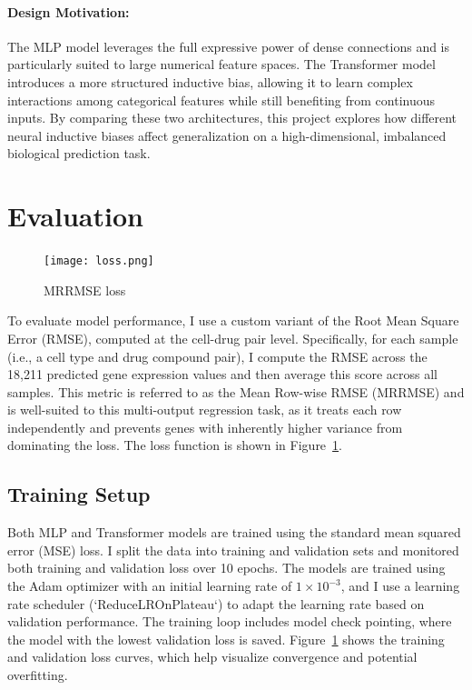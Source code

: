 \documentclass[11pt, oneside]{article}   	%
\begin{document}
\paragraph{Design Motivation:}
The MLP model leverages the full expressive power of dense connections and is particularly suited to large numerical feature spaces. The Transformer model introduces a more structured inductive bias, allowing it to learn complex interactions among categorical features while still benefiting from continuous inputs. By comparing these two architectures, this project explores how different neural inductive biases affect generalization on a high-dimensional, imbalanced biological prediction task.


\section*{Evaluation}

\begin{figure}[htbp]
  \centering
  \texttt{[image: loss.png]}
  \caption{MRRMSE loss}
  \label{fig:rmse}
\end{figure}

To evaluate model performance, I use a custom variant of the Root Mean Square Error (RMSE), computed at the cell-drug pair level. Specifically, for each sample (i.e., a cell type and drug compound pair), I compute the RMSE across the 18,211 predicted gene expression values and then average this score across all samples. This metric is referred to as the Mean Row-wise RMSE (MRRMSE) and is well-suited to this multi-output regression task, as it treats each row independently and prevents genes with inherently higher variance from dominating the loss. The loss function is shown in Figure~\ref{fig:rmse}. 

\subsection*{Training Setup}

Both MLP and Transformer models are trained using the standard mean squared error (MSE) loss. I split the data into training and validation sets and monitored both training and validation loss over 10 epochs. The models are trained using the Adam optimizer with an initial learning rate of $1 \times 10^{-3}$, and I use a learning rate scheduler (`ReduceLROnPlateau`) to adapt the learning rate based on validation performance. The training loop includes model check pointing, where the model with the lowest validation loss is saved. Figure~\ref{fig:rmse} shows the training and validation loss curves, which help visualize convergence and potential overfitting.
\end{document}
